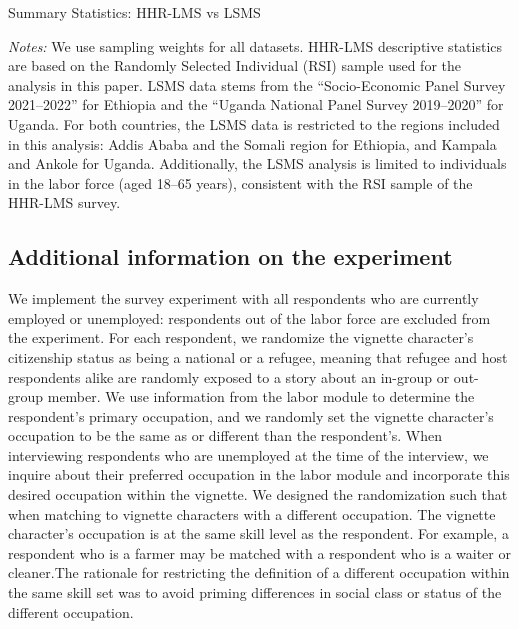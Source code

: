 \documentclass[a4paper,12pt]{article}
\renewcommand{\footnotesize}{\fontsize{8pt}{9pt}\selectfont}
\begin{document}
\begin{appendix}
\vspace{5mm}

\begin{table}[ht]
	\centering
	\begin{threeparttable}
		\caption{Summary Statistics: HHR-LMS vs LSMS}
		\label{tab:summary_stats}
		\scriptsize
		
		\begin{tablenotes}
			\footnotesize
			\item \textit{Notes:} We use sampling weights for all datasets. HHR-LMS descriptive statistics are based on the Randomly Selected Individual (RSI) sample used for the analysis in this paper. LSMS data stems from the ``Socio-Economic Panel Survey 2021–2022'' for Ethiopia and the ``Uganda National Panel Survey 2019–2020'' for Uganda. For both countries, the LSMS data is restricted to the regions included in this analysis: Addis Ababa and the Somali region for Ethiopia, and Kampala and Ankole for Uganda. Additionally, the LSMS analysis is limited to individuals in the labor force (aged 18–65 years), consistent with the RSI sample of the HHR-LMS survey.
		\end{tablenotes}
	\end{threeparttable}
\end{table}



\subsection{Additional information on the experiment} \label{sec: additional experiment}

We implement the survey experiment with all respondents who are currently employed or unemployed: respondents out of the labor force are excluded from the experiment. For each respondent, we randomize the vignette character's citizenship status as being a national or a refugee, meaning that refugee and host respondents alike are randomly exposed to a story about an in-group or out-group member. We use information from the labor module to determine the respondent's primary occupation, and we randomly set the vignette character's occupation to be the same as or different than the respondent's. When interviewing respondents who are unemployed at the time of the interview, we inquire about their preferred occupation in the labor module and incorporate this desired occupation within the vignette. We designed the randomization such that when matching to vignette characters with a different occupation. The vignette character's occupation is at the same skill level as the respondent. For example, a respondent who is a farmer may be matched with a respondent who is a waiter or cleaner.The rationale for restricting the definition of a different occupation within the same skill set was to avoid priming differences in social class or status of the different occupation.


\end{appendix}
\end{document}
